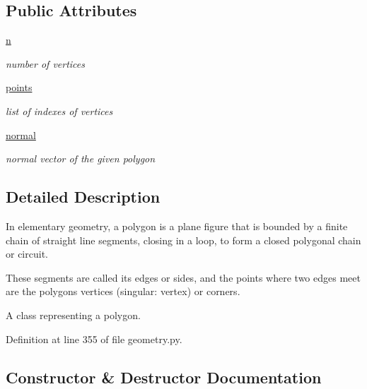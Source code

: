\subsection*{Public Attributes}
\begin{DoxyCompactItemize}
\item 
\hyperlink{classgeometry_1_1Polygon_a4491c008a2f035119ca3f56d38afd0cf}{n}
\begin{DoxyCompactList}\small\item\em number of vertices \end{DoxyCompactList}\item 
\hyperlink{classgeometry_1_1Polygon_aa0fda1ff74a09b8498bd7d8731b2fbf1}{points}
\begin{DoxyCompactList}\small\item\em list of indexes of vertices \end{DoxyCompactList}\item 
\hyperlink{classgeometry_1_1Polygon_a904adb19928f3de57ee46d4410c527e3}{normal}
\begin{DoxyCompactList}\small\item\em normal vector of the given polygon \end{DoxyCompactList}\end{DoxyCompactItemize}


\subsection{Detailed Description}
In elementary geometry, a polygon is a plane figure that is bounded by a finite chain of straight line segments, closing in a loop, to form a closed polygonal chain or circuit. 

These segments are called its edges or sides, and the points where two edges meet are the polygon\textquotesingle{}s vertices (singular\+: vertex) or corners. \begin{DoxyVerb}A class representing a polygon.\end{DoxyVerb}
 

Definition at line 355 of file geometry.\+py.



\subsection{Constructor \& Destructor Documentation}
